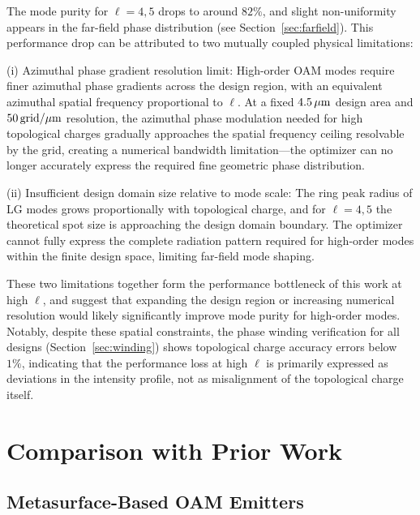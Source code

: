 \label{ssec:high_order_limit}

The mode purity for $\ell = 4, 5$ drops to around $82\%$, and slight non-uniformity appears in the far-field phase distribution (see Section~\ref{sec:farfield}). This performance drop can be attributed to two mutually coupled physical limitations:

(i) Azimuthal phase gradient resolution limit: High-order OAM modes require finer azimuthal phase gradients across the design region, with an equivalent azimuthal spatial frequency proportional to $\ell$. At a fixed $4.5\,\mu{\rm m}$ design area and $50\,{\rm grid/}\mu{\rm m}$ resolution, the azimuthal phase modulation needed for high topological charges gradually approaches the spatial frequency ceiling resolvable by the grid, creating a numerical bandwidth limitation—the optimizer can no longer accurately express the required fine geometric phase distribution.

(ii) Insufficient design domain size relative to mode scale: The ring peak radius of LG modes grows proportionally with topological charge, and for $\ell = 4, 5$ the theoretical spot size is approaching the design domain boundary. The optimizer cannot fully express the complete radiation pattern required for high-order modes within the finite design space, limiting far-field mode shaping.

These two limitations together form the performance bottleneck of this work at high $\ell$, and suggest that expanding the design region or increasing numerical resolution would likely significantly improve mode purity for high-order modes. Notably, despite these spatial constraints, the phase winding verification for all designs (Section~\ref{sec:winding}) shows topological charge accuracy errors below $1\%$, indicating that the performance loss at high $\ell$ is primarily expressed as deviations in the intensity profile, not as misalignment of the topological charge itself.

  


\section{Comparison with Prior Work}

\label{sec:comparison}

\subsection{Metasurface-Based OAM Emitters}

